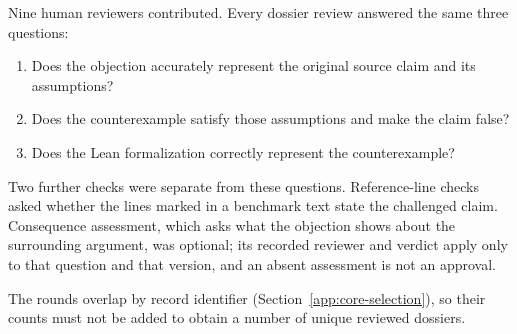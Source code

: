Nine human reviewers contributed. Every dossier review answered the same three questions:
\begin{enumerate}
    \item Does the objection accurately represent the original source claim and its assumptions?
    \item Does the counterexample satisfy those assumptions and make the claim false?
    \item Does the Lean formalization correctly represent the counterexample?
\end{enumerate}
Two further checks were separate from these questions. Reference-line checks asked whether the lines marked in a benchmark text state the challenged claim. Consequence assessment, which asks what the objection shows about the surrounding argument, was optional; its recorded reviewer and verdict apply only to that question and that version, and an absent assessment is not an approval.

The rounds overlap by record identifier (Section~\ref{app:core-selection}), so their counts must not be added to obtain a number of unique reviewed dossiers.

